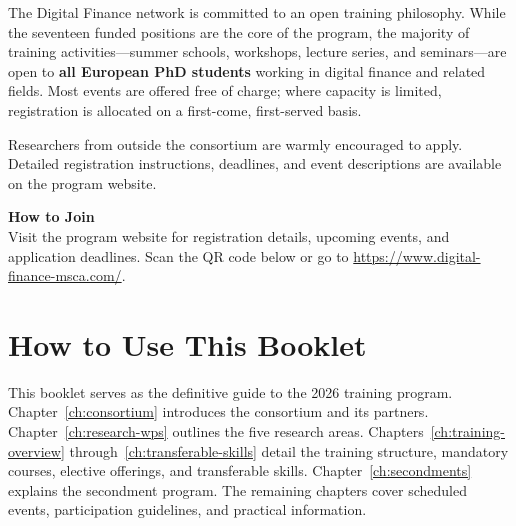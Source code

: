 The Digital Finance network is committed to an open training philosophy.  While
the seventeen funded positions are the core of the program, the majority of
training activities---summer schools, workshops, lecture series, and
seminars---are open to \textbf{all European PhD students} working in digital
finance and related fields.  Most events are offered free of charge; where
capacity is limited, registration is allocated on a first-come, first-served
basis.

Researchers from outside the consortium are warmly encouraged to apply.
Detailed registration instructions, deadlines, and event descriptions are
available on the program website.

\begin{highlightbox}
\textbf{How to Join}\\[4pt]
Visit the program website for registration details, upcoming events, and
application deadlines.  Scan the QR code below or go to
\url{https://www.digital-finance-msca.com/}.

\vspace{6pt}
\begin{center}
\end{center}
\end{highlightbox}

\section{How to Use This Booklet}
\label{sec:how-to-use}

This booklet serves as the definitive guide to the 2026 training program.
Chapter~\ref{ch:consortium} introduces the consortium and its partners.
Chapter~\ref{ch:research-wps} outlines the five research areas.
Chapters~\ref{ch:training-overview} through~\ref{ch:transferable-skills} detail
the training structure, mandatory courses, elective offerings, and transferable
skills.  Chapter~\ref{ch:secondments} explains the secondment program.  The
remaining chapters cover scheduled events, participation guidelines, and
practical information.
